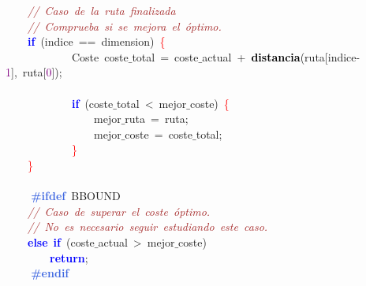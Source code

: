 \mbox{}\ \ \ \ \textit{\textcolor{Brown}{//\ Caso\ de\ la\ ruta\ finalizada}} \\
\mbox{}\ \ \ \ \textit{\textcolor{Brown}{//\ Comprueba\ si\ se\ mejora\ el\ óptimo.\ \ \ \ }} \\
\mbox{}\ \ \ \ \textbf{\textcolor{Blue}{if}}\ \textcolor{BrickRed}{(}indice\ \textcolor{BrickRed}{==}\ dimension\textcolor{BrickRed}{)}\ \textcolor{Red}{\{} \\
\mbox{}\ \ \ \ \ \ \ \ \ \ \ \ \textcolor{TealBlue}{Coste}\ coste$\_$total\ \textcolor{BrickRed}{=}\ coste$\_$actual\ \textcolor{BrickRed}{+}\ \textbf{\textcolor{Black}{distancia}}\textcolor{BrickRed}{(}ruta\textcolor{BrickRed}{[}indice\textcolor{BrickRed}{-}\textcolor{Purple}{1}\textcolor{BrickRed}{],}\ ruta\textcolor{BrickRed}{[}\textcolor{Purple}{0}\textcolor{BrickRed}{]);} \\
\mbox{} \\
\mbox{}\ \ \ \ \ \ \ \ \ \ \ \ \textbf{\textcolor{Blue}{if}}\ \textcolor{BrickRed}{(}coste$\_$total\ \textcolor{BrickRed}{\textless{}}\ mejor$\_$coste\textcolor{BrickRed}{)}\ \textcolor{Red}{\{} \\
\mbox{}\ \ \ \ \ \ \ \ \ \ \ \ \ \ \ \ mejor$\_$ruta\ \textcolor{BrickRed}{=}\ ruta\textcolor{BrickRed}{;} \\
\mbox{}\ \ \ \ \ \ \ \ \ \ \ \ \ \ \ \ mejor$\_$coste\ \textcolor{BrickRed}{=}\ coste$\_$total\textcolor{BrickRed}{;} \\
\mbox{}\ \ \ \ \ \ \ \ \ \ \ \ \textcolor{Red}{\}} \\
\mbox{}\ \ \ \ \textcolor{Red}{\}} \\
\mbox{}\ \ \ \  \\
\mbox{}\textbf{\textcolor{RoyalBlue}{\ \ \ \ \#ifdef}}\ BBOUND \\
\mbox{}\ \ \ \ \textit{\textcolor{Brown}{//\ Caso\ de\ superar\ el\ coste\ óptimo.}} \\
\mbox{}\ \ \ \ \textit{\textcolor{Brown}{//\ No\ es\ necesario\ seguir\ estudiando\ este\ caso.}} \\
\mbox{}\ \ \ \ \textbf{\textcolor{Blue}{else}}\ \textbf{\textcolor{Blue}{if}}\ \textcolor{BrickRed}{(}coste$\_$actual\ \textcolor{BrickRed}{\textgreater{}}\ mejor$\_$coste\textcolor{BrickRed}{)} \\
\mbox{}\ \ \ \ \ \ \ \ \textbf{\textcolor{Blue}{return}}\textcolor{BrickRed}{;} \\
\mbox{}\textbf{\textcolor{RoyalBlue}{\ \ \ \ \#endif}} \\
\mbox{}\ \ \ \  \\
